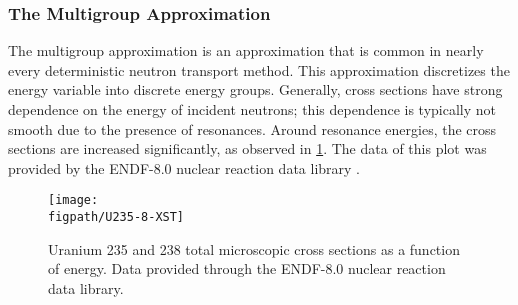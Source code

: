 {{{      \subsubsection{The Multigroup Approximation}{\label{sssec:NTT:The Multigroup Approximation}
        The multigroup approximation is an approximation that is common in nearly every deterministic neutron transport method.
        This approximation discretizes the energy variable into discrete energy groups.
        Generally, cross sections have strong dependence on the energy of incident neutrons; this dependence is typically not smooth due to the presence of resonances.
        Around resonance energies, the cross sections are increased significantly, as observed in \cref{fig:NTT:Cross Section plot}.
        The data of this plot was provided by the ENDF-8.0 nuclear reaction data library \cite{ENDF8}.

        \begin{figure}[h]
          \centering
          \texttt{[image: \\figpath/U235-8-XST]}
          \caption{Uranium 235 and 238 total microscopic cross sections as a function of energy. Data provided through the ENDF-8.0 nuclear reaction data library.}
          \label{fig:NTT:Cross Section plot}
        \end{figure}

}}}}
